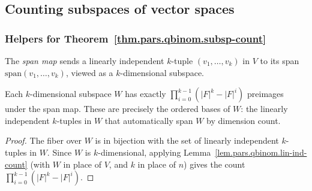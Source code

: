 \subsection{Counting subspaces of vector spaces}

\subsubsection{Helpers for Theorem~\ref{thm.pars.qbinom.subsp-count}}

\begin{definition}
\label{def.qbinomial-formulas.span-map}
\leanhelper
\leanok
The \emph{span map} sends a linearly independent $k$-tuple $(v_1, \ldots, v_k)$
in $V$ to its span $\mathrm{span}(v_1, \ldots, v_k)$, viewed as a $k$-dimensional subspace.
\end{definition}

\begin{lemma}
\label{lem.qbinomial-formulas.span-fiber-card}
\leanhelper
\leanok
Each $k$-dimensional subspace $W$ has exactly
$\prod_{i=0}^{k-1} (|F|^k - |F|^i)$ preimages under the span map.
These are precisely the ordered bases of $W$: the linearly independent
$k$-tuples in $W$ that automatically span $W$ by dimension count.
\end{lemma}

\begin{proof}
\leanok
The fiber over $W$ is in bijection with the set of linearly independent
$k$-tuples in $W$. Since $W$ is $k$-dimensional, applying
Lemma~\ref{lem.pars.qbinom.lin-ind-count} (with $W$ in place of $V$,
and $k$ in place of $n$) gives the count
$\prod_{i=0}^{k-1}(|F|^k - |F|^i)$.
\end{proof}

